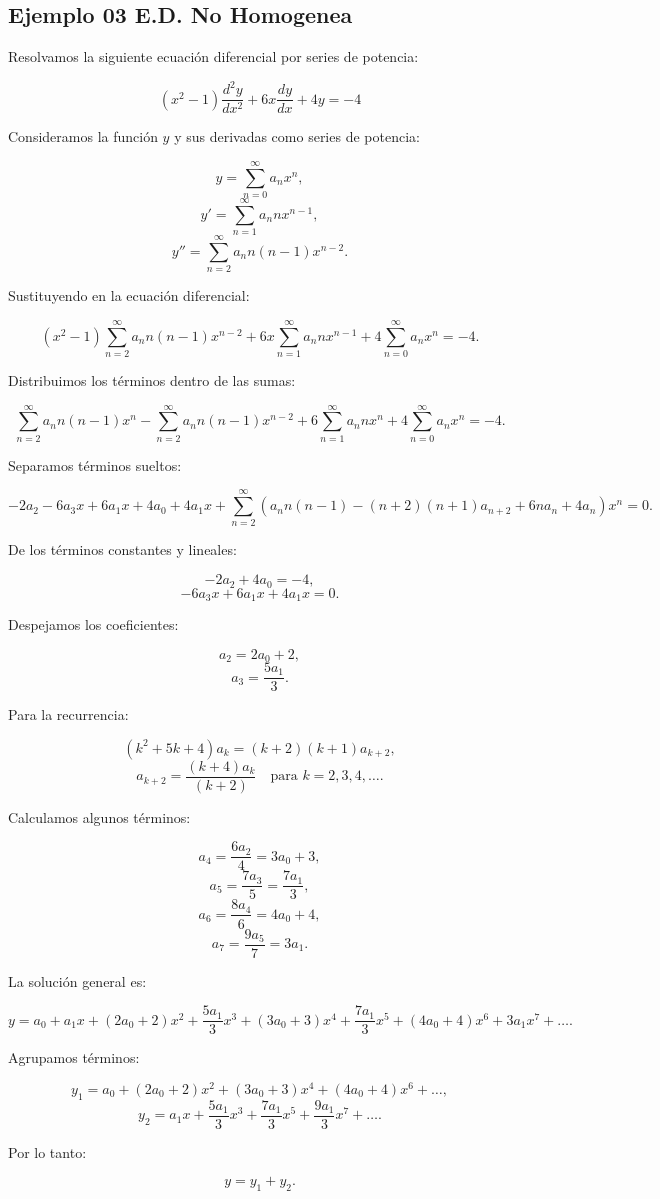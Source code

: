 \subsection{Ejemplo 03 E.D. No Homogenea}


Resolvamos la siguiente ecuación diferencial por series de potencia:

\[
(x^2 -1) \frac{d^2 y}{dx^2} + 6x \frac{d y}{dx} + 4y = -4
\]

Consideramos la función $y$ y sus derivadas como series de potencia:

\[
    y = \sum_{n=0}^{\infty} a_n x^n,
\]
\[
    y' = \sum_{n=1}^{\infty} a_n n x^{n-1},
\]
\[
    y'' = \sum_{n=2}^{\infty} a_n n (n-1) x^{n-2}.
\]

Sustituyendo en la ecuación diferencial:

\[
    (x^2 -1) \sum_{n=2}^{\infty} a_n n (n-1) x^{n-2} + 6x \sum_{n=1}^{\infty} a_n n x^{n-1} + 4\sum_{n=0}^{\infty} a_n x^n = -4.
\]

Distribuimos los términos dentro de las sumas:

\[
    \sum_{n=2}^{\infty} a_n n (n-1) x^n - \sum_{n=2}^{\infty} a_n n (n-1) x^{n-2} + 6\sum_{n=1}^{\infty} a_n n x^n + 4\sum_{n=0}^{\infty} a_n x^n = -4.
\]

Separamos términos sueltos:

\[
    -2a_2 -6a_3 x + 6a_1 x + 4a_0 + 4a_1 x + \sum_{n=2}^{\infty} (a_n n (n-1) - (n+2)(n+1) a_{n+2} + 6n a_n + 4a_n)x^n = 0.
\]

De los términos constantes y lineales:

\[
    -2a_2 + 4a_0 = -4,
\]
\[
    -6a_3 x + 6a_1 x + 4a_1 x = 0.
\]

Despejamos los coeficientes:

\[
    a_2 = 2a_0 + 2,
\]
\[
    a_3 = \frac{5a_1}{3}.
\]

Para la recurrencia:

\[
    (k^2 + 5k + 4) a_k = (k+2)(k+1) a_{k+2},
\]
\[
    a_{k+2} = \frac{(k+4) a_k}{(k+2)} \quad \text{para } k = 2,3,4,\dots.
\]

Calculamos algunos términos:

\[
    a_4 = \frac{6a_2}{4} = 3a_0 + 3,
\]
\[
    a_5 = \frac{7a_3}{5} = \frac{7a_1}{3},
\]
\[
    a_6 = \frac{8a_4}{6} = 4a_0 + 4,
\]
\[
    a_7 = \frac{9a_5}{7} = 3a_1.
\]

La solución general es:

\[
    y = a_0 + a_1 x + (2a_0 + 2)x^2 + \frac{5a_1}{3}x^3 + (3a_0 + 3)x^4 + \frac{7a_1}{3}x^5 + (4a_0 + 4)x^6 + 3a_1 x^7 + \dots.
\]

Agrupamos términos:

\[
    y_1 = a_0 + (2a_0 + 2)x^2 + (3a_0 + 3)x^4 + (4a_0 + 4)x^6 + \dots,
\]
\[
    y_2 = a_1 x + \frac{5a_1}{3}x^3 + \frac{7a_1}{3}x^5 + \frac{9a_1}{3}x^7 + \dots.
\]

Por lo tanto:

\[
    y = y_1 + y_2.
\]



